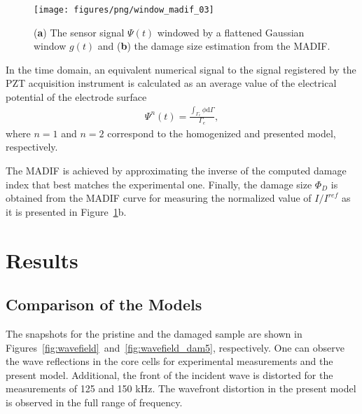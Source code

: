 \documentclass[sensors,article,accept,moreauthors,pdftex]{Definitions/mdpi}
\begin{document}
\begin{paracol}{2}
\vspace{-6pt}
\begin{figure}[H]
		\texttt{[image: figures/png/window\_madif\_03]}
	\caption{(\textbf{a}) The %
 sensor signal \(\Psi(t)\) windowed by a flattened Gaussian window \(g(t)\) and (\textbf{b}) the damage size estimation from the MADIF.}
	\label{fig:window_madif}
\end{figure}
In the time domain, an equivalent numerical signal to the signal registered by the PZT acquisition instrument is calculated as an average value of the electrical potential of the electrode surface
\begin{eqnarray}
	\Psi^{n}(t) = \frac{\int_{\Gamma_e}\phi\mathrm{d}\Gamma}{\Gamma_e},
	\label{eq:psi}
\end{eqnarray}
where \(n=1\) and \(n=2\) correspond to the homogenized and presented model, respectively.

The MADIF is achieved by approximating the inverse of the computed damage index that best matches the experimental one.
Finally, the damage size \(\Phi_D\) is obtained from the MADIF curve for measuring the normalized value of \(I/I^{ref}\) as it is presented in Figure~\ref{fig:window_madif}b.
\section{Results}
\label{sec:results}
\subsection{Comparison of the Models}
\label{comparison}
The snapshots for the pristine and the damaged sample are shown in \mbox{Figures~\ref{fig:wavefield} and \ref{fig:wavefield_dam5}}, respectively.
One can observe the wave reflections in the core cells for experimental measurements and the present model. 
Additional, the front of the incident wave is distorted for the measurements of 125 and 150 kHz.
The wavefront distortion in the present model is observed in the full range of frequency. 


\end{paracol}
\end{document}
